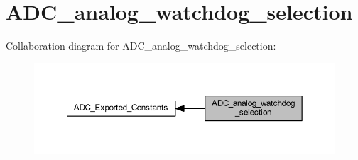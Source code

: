 \hypertarget{group___a_d_c__analog__watchdog__selection}{}\section{A\+D\+C\+\_\+analog\+\_\+watchdog\+\_\+selection}
\label{group___a_d_c__analog__watchdog__selection}
Collaboration diagram for A\+D\+C\+\_\+analog\+\_\+watchdog\+\_\+selection\+:
\nopagebreak
\begin{figure}[H]
\begin{center}
\leavevmode
\includegraphics[width=350pt]{group___a_d_c__analog__watchdog__selection}
\end{center}
\end{figure}
